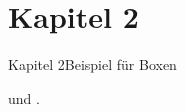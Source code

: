 
\if{}\section{Kapitel 2}\fi

\begin{frame}[fragile, label={kapitel2}]{Kapitel 2}{Beispiel für Boxen}
    \begin{itemize}
       {} und .
    \end{itemize}
\end{frame}
